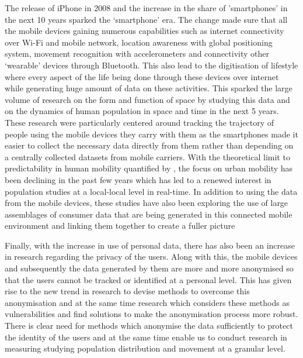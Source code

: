 The release of iPhone in 2008 and the increase in the share of 'smartphones' in the next 10 years sparked the `smartphone' era. 
The change made sure that all the mobile devices gaining numerous capabilities such as internet connectivity over Wi-Fi and mobile network, location awareness with global positioning system, movement recognition with accelerometers and connectivity other `wearable' devices through Bluetooth.
This also lead to the digitisation of lifestyle where every aspect of the life being done through these devices over internet while generating huge amount of data on these activities.
This sparked the large volume of research on the form and function of space by studying this data and on the dynamics of human population in space and time in the next 5 years.
These research were particularly centered around tracking the trajectory of people using the mobile devices they carry with them as the smartphones made it easier to collect the necessary data directly from them rather than depending on a centrally collected datasets from mobile carriers. 
With the theoretical limit to predictability in human mobility quantified by \citet{song2010}, the focus on urban mobility has been declining in the past few years which has led to a renewed interest in population studies at a local-local level in real-time.
In addition to using the data from the mobile devices, these studies have also been exploring the use of large assemblages of consumer data that are being generated in this connected mobile environment and linking them together to create a fuller picture \cite{cdrc2018}


Finally, with the increase in use of personal data, there has also been an increase in research regarding the privacy of the users.
Along with this, the mobile devices and subsequently the data generated by them are more and more anonymised so that the users cannot be tracked or identified at a personal level.
This has given rise to the new trend in research to devise methods to overcome this anonymisation and at the same time research which considers these methods as vulnerabilities and find solutions to make the anonymisation process more robust. 
There is clear need for methods which anonymise the data sufficiently to protect the identity of the users and at the same time enable us to conduct research in
measuring studying population distribution and movement at a granular level.

